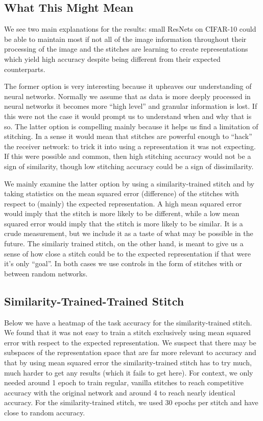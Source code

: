 \documentclass{article} %
\begin{document}
\subsection*{What This Might Mean}
We see two main explanations for the results: small ResNets on CIFAR-10 could be able to maintain most if not all of the image
information throughout their processing of the image and the stitches are learning to create representations which yield high
accuracy despite being different from their expected counterparts.

The former option is very interesting because it upheaves our understanding of neural networks. Normally we assume that
as data is more deeply processed in neural networks it becomes more ``high level'' and granular information is lost. If
this were not the case it would prompt us to understand when and why that is so. The latter option is compelling mainly
because it helps us find a limitation of stitching. In a sense it would mean that stitches are powerful enough to ``hack''
the receiver network: to trick it into using a representation it was not expecting. If this were possible and common, then
high stitching accuracy would not be a sign of similarity, though low stitching accuracy could be a sign of dissimilarity.

We mainly examine the latter option by using a similarity-trained stitch and by taking statistics on the mean squared
error (difference) of the stitches with respect to (mainly) the expected representation. A high mean squared error would
imply that the stitch is more likely to be different, while a low mean squared error would imply that the stitch is more
likely to be similar. It is a crude measurement, but we include it as a taste of what may be possible in the future. The
similariy trained stitch, on the other hand, is meant to give us a sense of how close a stitch could be to the expected
representation if that were it's only ``goal''. In both cases we use controls in the form of stitches with or between
random networks.

\subsection*{Similarity-Trained-Trained Stitch}
Below we have a heatmap of the task accuracy for the similarity-trained stitch. We found that it was not
easy to train a stitch exclusively using mean squared error with respect to the expected representation. We suspect
that there may be subspaces of the representation space that are far more relevant to accuracy and that by using
mean squared error the similarity-trained stitch has to try much, much harder to get any results (which it fails
to get here). For context, we only needed around 1 epoch to train regular, vanilla stitches to reach competitive accuracy
with the original network and around 4 to reach nearly identical accuracy. For the similarity-trained stitch, we used 30
epochs per stitch and have close to random accuracy.
\end{document}
